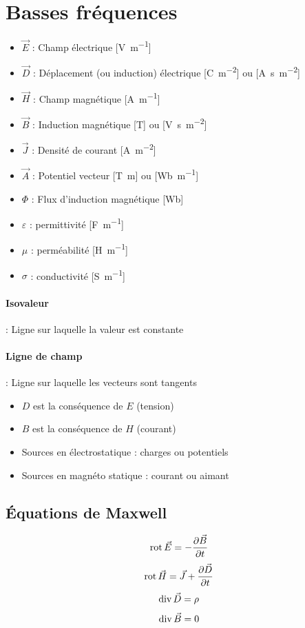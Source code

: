 \documentclass[resume]{subfiles}
\begin{document}
\section{Basses fréquences}
\begin{itemize}
\item $\vec{E}$ : Champ électrique [\si{\volt\per\meter}]
\item $\vec{D}$ : Déplacement (ou induction) électrique [\si{\coulomb\per\square\meter}] ou [\si{\ampere\second\per\square\meter}]
\item $\vec{H}$ : Champ magnétique [\si{\ampere\per\meter}]
\item $\vec{B}$ : Induction magnétique [\si{\tesla}] ou [\si{\volt\second\per\square\meter}]
\item $\vec{J}$ : Densité de courant [\si{\ampere\per\square\meter}]
\item $\vec{A}$ : Potentiel vecteur [\si{\tesla\meter}] ou [\si{\weber\per\meter}]
\item $\Phi$ : Flux d'induction magnétique [\si{\weber}]
\item $\varepsilon$ : permittivité [\si{\farad\per\meter}]
\item $\mu$ : perméabilité [\si{\henry\per\meter}]
\item $\sigma$ : conductivité [\si{\siemens\per\meter}]
\end{itemize}
\paragraph{Isovaleur} : Ligne sur laquelle la valeur est constante
\paragraph{Ligne de champ} : Ligne sur laquelle les vecteurs sont tangents
\begin{itemize}
\item $D$ est la conséquence de $E$ (tension)
\item $B$ est la conséquence de $H$ (courant)
\end{itemize}
\begin{itemize}
\item Sources en électrostatique : charges ou potentiels
\item Sources en magnéto statique : courant ou aimant
\end{itemize}



\subsection{Équations de Maxwell}
$$\operatorname{rot}\vec{E}=-\frac{\partial \vec{B}}{\partial t}$$
$$\operatorname{rot}\vec{H}=\vec{J}+\frac{\partial \vec{D}}{\partial t}$$
$$\operatorname{div}\vec{D}=\rho$$
$$\operatorname{div}\vec{B}=0$$
\end{document}
